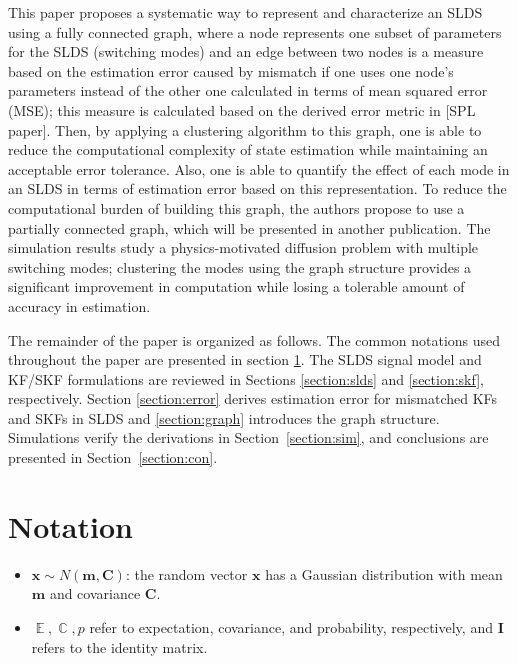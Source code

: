 \documentclass[journal]{IEEEtran}
\DeclareMathOperator{\E}{\mathbb{E}}
\DeclareMathOperator{\C}{\mathbb{C}}
\begin{document}
This paper proposes a systematic way to represent and characterize an SLDS using a fully connected graph, where a node represents one subset of parameters for the SLDS (switching modes) and an edge between two nodes is a measure based on the estimation error caused by mismatch if one uses one node's parameters instead of the other one calculated in terms of mean squared error (MSE); this measure is calculated based on the derived error metric in [SPL paper]. Then, by applying a clustering algorithm to this graph, one is able to reduce the computational complexity of state estimation while maintaining an acceptable error tolerance. Also, one is able to quantify the effect of each mode in an SLDS in terms of estimation error based on this representation. To reduce the computational burden of building this graph, the authors propose to use a partially connected graph, which will be presented in another publication. The simulation results study a physics-motivated diffusion problem with multiple switching modes; clustering the modes using the graph structure provides a significant improvement in computation while losing a tolerable amount of accuracy in estimation. 



The remainder of the paper is organized as follows. The common notations used throughout the paper are presented in section \ref{section:not}. The SLDS signal model and KF/SKF formulations are reviewed in Sections \ref{section:slds} and \ref{section:skf}, respectively. Section \ref{section:error} derives estimation error for mismatched KFs and SKFs in SLDS and \ref{section:graph} introduces the graph structure. Simulations verify the derivations in Section~\ref{section:sim}, and conclusions are presented in Section~\ref{section:con}. 



\section{Notation}\label{section:not}
\begin{itemize}
    \item $\bm{x}\sim N(\bm{m},\bm{C})$: the random vector $\bm{x}$ has a Gaussian distribution with mean $\bm{m}$ and covariance $\bm{C}$.
\item $\E,\C,p$ refer to expectation, covariance, and probability, respectively, and $\bm{I}$ refers to the identity matrix. 
 \end{itemize}
 \vspace{-.55cm}
\end{document}
